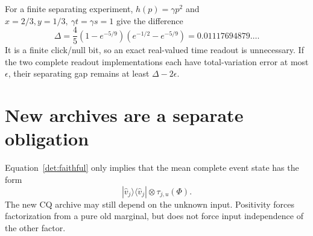 \documentclass[11pt,oneside,openany]{book}
\theoremstyle{definition}
\theoremstyle{remark}\newtheorem{remark}[theorem]{Remark}
\begin{document}
For a finite separating experiment, $h(p)=\gamma p^2$ and
$x=2/3,y=1/3,\ \gamma t=\gamma s=1$ give the difference
\begin{equation}
 \Delta=\frac45(1-e^{-5/9})(e^{-1/2}-e^{-5/9})
        =0.01117694879\ldots.                    \label{det:rate-witness}
\end{equation}
It is a finite click/null bit, so an exact real-valued time readout is
unnecessary. If the two complete readout implementations each have
total-variation error at most $\epsilon$, their separating gap remains
at least $\Delta-2\epsilon$.

\section{New archives are a separate obligation}

Equation~\eqref{det:faithful} only implies that the mean complete event
state has the form
\begin{equation}
 |\widehat v_j\rangle\langle\widehat v_j|
                         \otimes\tau_{j,u}(\Phi).             \label{det:archive-open}
\end{equation}
The new CQ archive may still depend on the unknown input. Positivity
forces factorization from a pure old marginal, but does not force
input independence of the other factor.
\end{document}
